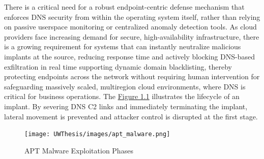 \documentclass [11pt, proquest] {uwthesis}[2020/02/24]
\begin{document}
There is a critical need for a robust endpoint-centric defense mechanism that enforces DNS security from within the operating system itself, rather than relying on passive userspace monitoring or centralized anomaly detection tools. As cloud providers face increasing demand for secure, high-availability infrastructure, there is a growing requirement for systems that can instantly neutralize malicious implants at the source, reducing response time and actively blocking DNS-based exfiltration in real time supporting dynamic domain blacklisting, thereby protecting endpoints across the network without requiring human intervention for safeguarding massively scaled, multiregion cloud environments, where DNS is critical for business operations.
The \hyperref[sec:apt_malware_flow]{Figure 1.1} illustrates the lifecycle of an implant. By severing DNS C2 links and immediately terminating the implant, lateral movement is prevented and attacker control is disrupted at the first stage.
\begin{figure}[H]
\centering
\texttt{[image: UWThesis/images/apt\_malware.png]}
\caption{APT Malware Exploitation Phases}
\label{sec:apt_malware_flow}
\end{figure}

\end{document}
